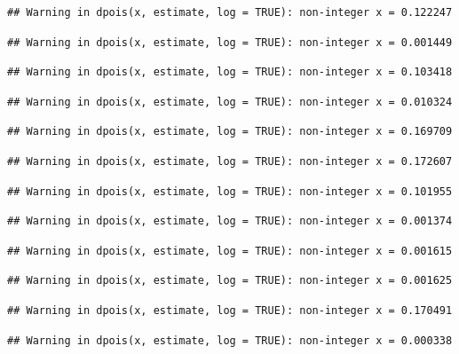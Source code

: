 \documentclass[]{article}
\begin{document}
\begin{verbatim}
## Warning in dpois(x, estimate, log = TRUE): non-integer x = 0.122247
\end{verbatim}

\begin{verbatim}
## Warning in dpois(x, estimate, log = TRUE): non-integer x = 0.001449
\end{verbatim}

\begin{verbatim}
## Warning in dpois(x, estimate, log = TRUE): non-integer x = 0.103418
\end{verbatim}

\begin{verbatim}
## Warning in dpois(x, estimate, log = TRUE): non-integer x = 0.010324
\end{verbatim}

\begin{verbatim}
## Warning in dpois(x, estimate, log = TRUE): non-integer x = 0.169709
\end{verbatim}

\begin{verbatim}
## Warning in dpois(x, estimate, log = TRUE): non-integer x = 0.172607
\end{verbatim}

\begin{verbatim}
## Warning in dpois(x, estimate, log = TRUE): non-integer x = 0.101955
\end{verbatim}

\begin{verbatim}
## Warning in dpois(x, estimate, log = TRUE): non-integer x = 0.001374
\end{verbatim}

\begin{verbatim}
## Warning in dpois(x, estimate, log = TRUE): non-integer x = 0.001615
\end{verbatim}

\begin{verbatim}
## Warning in dpois(x, estimate, log = TRUE): non-integer x = 0.001625
\end{verbatim}

\begin{verbatim}
## Warning in dpois(x, estimate, log = TRUE): non-integer x = 0.170491
\end{verbatim}

\begin{verbatim}
## Warning in dpois(x, estimate, log = TRUE): non-integer x = 0.000338
\end{verbatim}
\end{document}
